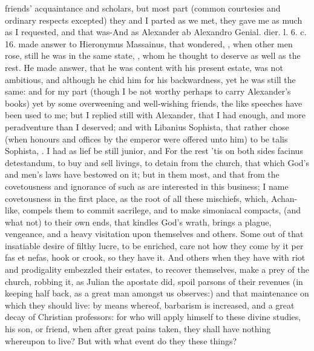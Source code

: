 {friends' acquaintance and scholars, but most part (common courtesies
and ordinary respects excepted) they and I parted as we met, they gave
me as much as I requested, and that was-And as Alexander ab Alexandro
Genial. dier. l. 6. c. 16. made answer to Hieronymus Massainus, that
wondered, , when other men rose, still he was in the
same state, , whom he thought to deserve as well as the rest. He made
answer, that he was content with his present estate, was not ambitious,
and although  he chid him
for his backwardness, yet he was still the same: and for my part
(though I be not worthy perhaps to carry Alexander's books) yet by some
overweening and well-wishing friends, the like speeches have been used
to me; but I replied still with Alexander, that I had enough, and more
peradventure than I deserved; and with Libanius Sophista, that rather
chose (when honours and offices by the emperor were offered unto him)
to be talis Sophista, . I had as lief be still
\Democritus{} junior, and  For the rest
'tis on both sides facinus detestandum, to buy and sell livings, to
detain from the church, that which God's and men's laws have bestowed
on it; but in them most, and that from the covetousness and ignorance
of such as are interested in this business; I name covetousness in the
first place, as the root of all these mischiefs, which, Achan-like,
compels them to commit sacrilege, and to make simoniacal compacts, (and
what not) to their own ends, that kindles God's wrath, brings a
plague, vengeance, and a heavy visitation upon themselves and others.
Some out of that insatiable desire of filthy lucre, to be enriched,
care not how they come by it per fas et nefas, hook or crook, so they
have it. And others when they have with riot and prodigality embezzled
their estates, to recover themselves, make a prey of the church,
robbing it, as Julian the apostate did, spoil parsons of their
revenues (in keeping half back, as a great man amongst us
observes:) and that maintenance on which they should live: by means
whereof, barbarism is increased, and a great decay of Christian
professors: for who will apply himself to these divine studies, his
son, or friend, when after great pains taken, they shall have nothing
whereupon to live? But with what event do they these things?

}

